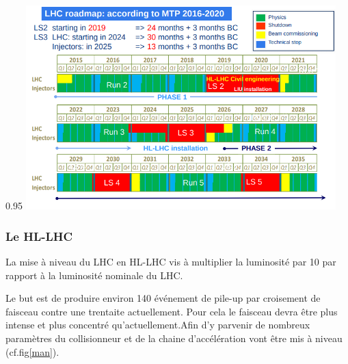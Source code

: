 \begin{minipagewithmarginpars}[h]{0.95\textwidth}
	\centering
	\includegraphics[width=0.9\textwidth]{LHC/roadmap.png}
	\label{roadmap}	
\end{minipagewithmarginpars}

\subsubsection{Le HL-LHC}
La mise à niveau du LHC en HL-LHC vis à multiplier la luminosité par 10 par rapport à la luminosité nominale du LHC.

Le but est de produire environ 140 événement de pile-up par croisement de faisceau contre une trentaite actuellement. Pour cela le faisceau devra être plus intense et plus concentré qu'actuellement.Afin d'y parvenir de nombreux paramètres du collisionneur et de la chaine d'accélération vont être mis à niveau (cf.fig\ref{man}).

